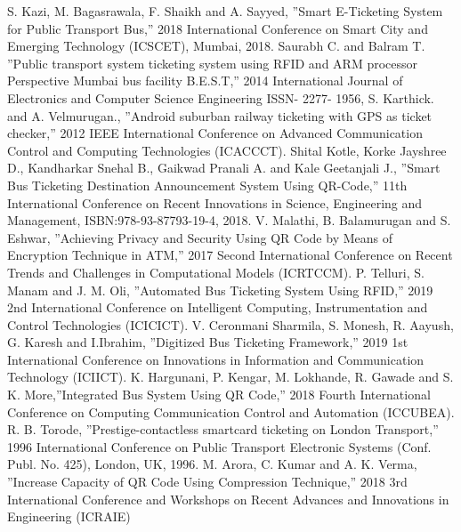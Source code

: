 
\new [1] S. Kazi, M. Bagasrawala, F. Shaikh and A. Sayyed, ”Smart E-Ticketing System for Public Transport Bus,” 2018 International Conference on Smart City and Emerging Technology (ICSCET), Mumbai, 2018. 
\new[2] Saurabh C. and Balram T. ”Public transport system ticketing system using RFID and ARM processor Perspective Mumbai bus facility B.E.S.T,” 2014 International Journal of Electronics and Computer Science Engineering ISSN- 2277- 1956, 
\new[3] S. Karthick. and A. Velmurugan., ”Android suburban railway ticketing with GPS as ticket checker,” 2012 IEEE International Conference on Advanced Communication Control and Computing Technologies (ICACCCT). 
\new[4] Shital Kotle, Korke Jayshree D., Kandharkar Snehal B., Gaikwad Pranali A. and Kale Geetanjali J., ”Smart Bus Ticketing Destination Announcement System Using QR-Code,” 11th International Conference on Recent Innovations in Science, Engineering and Management, ISBN:978-93-87793-19-4, 2018. 
\new[5] V. Malathi, B. Balamurugan and S. Eshwar, ”Achieving Privacy and Security Using QR Code by Means of Encryption Technique in ATM,” 2017 Second International Conference on Recent Trends and Challenges in Computational Models (ICRTCCM). 
\new[6] P. Telluri, S. Manam and J. M. Oli, ”Automated Bus Ticketing System Using RFID,” 2019 2nd International Conference on Intelligent Computing, Instrumentation and Control Technologies (ICICICT). 
\new[7] V. Ceronmani Sharmila, S. Monesh, R. Aayush, G. Karesh and I.Ibrahim, ”Digitized Bus Ticketing Framework,” 2019 1st International Conference on Innovations in Information and Communication Technology (ICIICT). 
\new[8] K. Hargunani, P. Kengar, M. Lokhande, R. Gawade and S. K. More,”Integrated Bus System Using QR Code,” 2018 Fourth International Conference on Computing Communication Control and Automation (ICCUBEA). 
\new[9] R. B. Torode, ”Prestige-contactless smartcard ticketing on London Transport,” 1996 International Conference on Public Transport Electronic Systems (Conf. Publ. No. 425), London, UK, 1996. 
\new[10] M. Arora, C. Kumar and A. K. Verma, ”Increase Capacity of QR Code Using Compression Technique,” 2018 3rd International Conference and Workshops on Recent Advances and Innovations in Engineering (ICRAIE)



